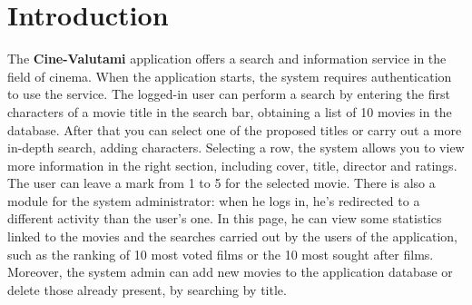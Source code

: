 \documentclass[a4paper, oneside]{article}
\begin{document}
\baselineskip 13pt

\begin{frontespizio} 
 \Preambolo{\renewcommand{\frontpretitlefont}{\fontsize{15}{12}\scshape}}
\Rientro {1cm}
 \Punteggiatura {}
\end{frontespizio}

\clearpage

	\tableofcontents\thispagestyle{empty}
	\clearpage


\section{Introduction}
The \textbf{Cine-Valutami} application offers a search and information service in the field of cinema. When the application starts, the system requires authentication to use the service.
The logged-in user can perform a search by entering the first characters of a movie title in the search bar, obtaining a list of 10 movies in the database. After that you can select one of the proposed titles or carry out a more in-depth search, adding characters.
Selecting a row, the system allows you to view more information in the right section, including cover, title, director and ratings.
The user can leave a mark from 1 to 5 for the selected movie.
There is also a module for the system administrator: when he logs in, he's redirected to a different activity than the user's one. In this page, he can view some statistics linked to the movies and the searches carried out by the users of the application, such as the ranking of 10 most voted films or the 10 most sought after films.
Moreover, the system admin can add new movies to the application database or delete those already present, by searching by title.
\end{document}
